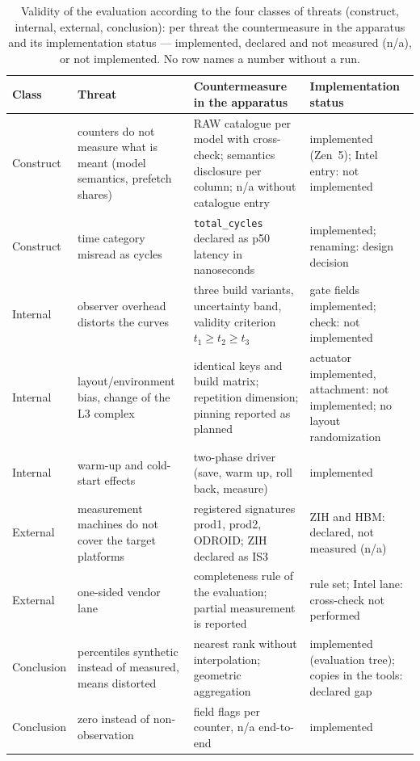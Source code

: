 \begin{nurlang}
\begin{table}[htbp]
\begin{tabular}{@{}>{\raggedright\arraybackslash}p{1.6cm}>{\raggedright\arraybackslash}p{4.0cm}>{\raggedright\arraybackslash}p{4.9cm}>{\raggedright\arraybackslash}p{3.7cm}@{}}
\toprule
Class & Threat & Countermeasure in the apparatus & Implementation status \\
\midrule
Construct & counters do not measure what is meant (model semantics, prefetch shares) & RAW catalogue per model with cross-check; semantics disclosure per column; n/a without catalogue entry & implemented (Zen~5); Intel entry: not implemented \\
Construct & time category misread as cycles & \texttt{total\_cycles} declared as p50 latency in nanoseconds & implemented; renaming: design decision \\
Internal & observer overhead distorts the curves & three build variants, uncertainty band, validity criterion $t_1 \ge t_2 \ge t_3$ & gate fields implemented; check: not implemented \\
Internal & layout/environment bias, change of the L3 complex & identical keys and build matrix; repetition dimension; pinning reported as planned & actuator implemented, attachment: not implemented; no layout randomization \\
Internal & warm-up and cold-start effects & two-phase driver (save, warm up, roll back, measure) & implemented \\
External & measurement machines do not cover the target platforms & registered signatures prod1, prod2, ODROID\@; ZIH declared as IS3 & ZIH and HBM\@: declared, not measured (n/a) \\
External & one-sided vendor lane & completeness rule of the evaluation; partial measurement is reported & rule set; Intel lane: cross-check not performed \\
Conclusion & percentiles synthetic instead of measured, means distorted & nearest rank without interpolation; geometric aggregation & implemented (evaluation tree); copies in the tools: declared gap \\
Conclusion & zero instead of non-observation & field flags per counter, n/a end-to-end & implemented \\
\bottomrule
\end{tabular}
\caption{Validity of the evaluation according to the four classes of threats (construct, internal,
external, conclusion): per threat the countermeasure in the apparatus and its implementation status
--- implemented, declared and not measured (n/a), or not implemented. No row names a number without
a run.}\label{tab:eval-gueltigkeit}
\end{table}
\end{nurlang}
